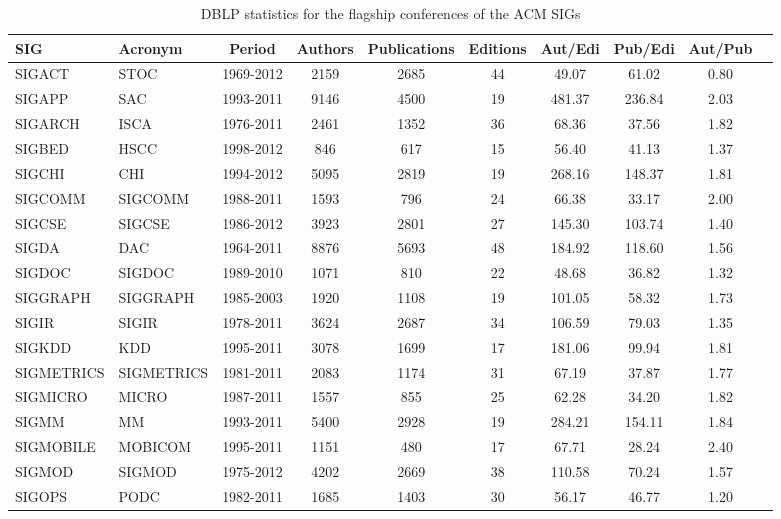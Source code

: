 \documentclass{sig-alternate-10pt}
\begin{document}
\begin{table}[t]
\centering
\caption{DBLP statistics for the flagship conferences of the ACM SIGs}
\begin{scriptsize}
\begin{tabular}{|l|l|c|c|c|c|c|c|c|c|} \hline
\bf{SIG} & \bf{Acronym} & \bf{Period} & \bf{Authors} & \bf{Publications} & \bf{Editions} & \bf{Aut/Edi} & \bf{Pub/Edi} & \bf{Aut/Pub}\\ \hline
SIGACT & STOC & 1969-2012 & 2159 & 2685 & 44 & 49.07 & 61.02 & 0.80\\ \hline
SIGAPP & SAC & 1993-2011 & 9146 & 4500 & 19 & 481.37 & 236.84 & 2.03\\ \hline
SIGARCH & ISCA & 1976-2011 & 2461 & 1352 & 36 & 68.36 & 37.56 & 1.82\\ \hline
SIGBED & HSCC & 1998-2012 & 846 & 617 & 15 & 56.40 & 41.13 & 1.37\\ \hline
SIGCHI & CHI & 1994-2012 & 5095 & 2819 & 19 & 268.16 & 148.37 & 1.81\\ \hline
SIGCOMM & SIGCOMM & 1988-2011 & 1593 & 796 & 24 & 66.38 & 33.17 & 2.00\\ \hline
SIGCSE & SIGCSE & 1986-2012 & 3923 & 2801 & 27 & 145.30 & 103.74 & 1.40\\ \hline
SIGDA & DAC & 1964-2011 & 8876 & 5693 & 48 & 184.92 & 118.60 & 1.56\\ \hline
SIGDOC & SIGDOC & 1989-2010 & 1071 & 810 & 22 & 48.68 & 36.82 & 1.32\\ \hline
SIGGRAPH & SIGGRAPH & 1985-2003 & 1920 & 1108 & 19 & 101.05 & 58.32 & 1.73\\ \hline
SIGIR & SIGIR & 1978-2011 & 3624 & 2687 & 34 & 106.59 & 79.03 & 1.35\\ \hline
SIGKDD & KDD & 1995-2011 & 3078 & 1699 & 17 & 181.06 & 99.94 & 1.81\\ \hline
SIGMETRICS & SIGMETRICS & 1981-2011 & 2083 & 1174 & 31 & 67.19 & 37.87 & 1.77\\ \hline
SIGMICRO & MICRO & 1987-2011 & 1557 & 855 & 25 & 62.28 & 34.20 & 1.82\\ \hline
SIGMM & MM & 1993-2011 & 5400 & 2928 & 19 & 284.21 & 154.11 & 1.84\\ \hline
SIGMOBILE & MOBICOM & 1995-2011 & 1151 & 480 & 17 & 67.71 & 28.24 & 2.40\\ \hline
SIGMOD & SIGMOD & 1975-2012 & 4202 & 2669 & 38 & 110.58 & 70.24 & 1.57\\ \hline
SIGOPS & PODC & 1982-2011 & 1685 & 1403 & 30 & 56.17 & 46.77 & 1.20\\ \hline

\end{tabular}
\end{scriptsize}
\end{table}
\end{document}
